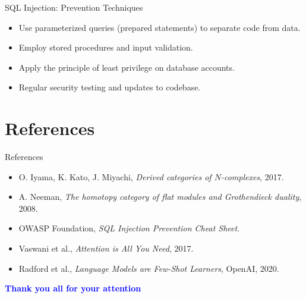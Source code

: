 \documentclass[t,ignorenonframetext]{beamer}
\begin{document}
\begin{frame}{SQL Injection: Prevention Techniques}
\begin{itemize}
\item Use parameterized queries (prepared statements) to separate code from data.
\item Employ stored procedures and input validation.
\item Apply the principle of least privilege on database accounts.
\item Regular security testing and updates to codebase.
\end{itemize}
\end{frame}

\section{References}
\begin{frame}{References}
\tiny
\begin{itemize}
\item O. Iyama, K. Kato, J. Miyachi, \textit{Derived categories of $N$-complexes}, 2017.
\item A. Neeman, \textit{The homotopy category of flat modules and Grothendieck duality}, 2008.
\item OWASP Foundation, \textit{SQL Injection Prevention Cheat Sheet}.
\item Vaswani et al., \textit{Attention is All You Need}, 2017.
\item Radford et al., \textit{Language Models are Few-Shot Learners}, OpenAI, 2020.
\end{itemize}
\end{frame}

\begin{frame}
\vspace{3cm}
\begin{center}
\begin{LARGE}
\textcolor{blue}{\textbf{Thank you all for your attention}}
\end{LARGE}
\end{center}
\end{frame}
\end{document}
